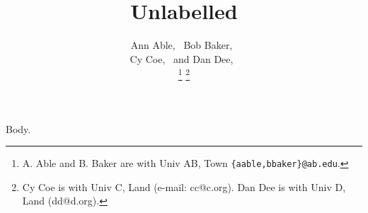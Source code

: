 \documentclass[journal]{IEEEtran}
\begin{document}
\title{Unlabelled}
\author{Ann Able,~
  Bob Baker,~\\
  Cy Coe,~
  and Dan Dee,~

  \thanks{A. Able and B. Baker are with Univ AB, Town {\tt\small \{aable,bbaker\}@ab.edu}.}
  \thanks{Cy Coe is with Univ C, Land (e-mail: cc@c.org). Dan Dee is with Univ D, Land (dd@d.org).}}
\maketitle
Body.
\end{document}
